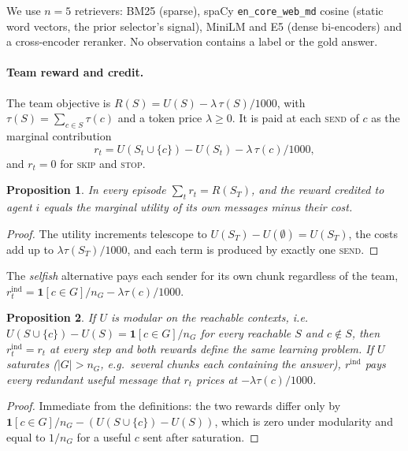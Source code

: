 \documentclass[sigconf,anonymous]{aamas}
\theoremstyle{plain}
\newtheorem{proposition}{Proposition}
\theoremstyle{definition}
\begin{document}
\noindent We use $n=5$ retrievers: BM25 (sparse), spaCy \texttt{en\_core\_web\_md} cosine (static word vectors, the prior selector's signal), MiniLM and E5 (dense bi-encoders) and a cross-encoder reranker. No observation contains a label or the gold answer.

\paragraph{Team reward and credit.}
The team objective is $R(S)=U(S)-\lambda\,\tau(S)/1000$, with $\tau(S)=\sum_{c\in S}\tau(c)$ and a token price $\lambda\ge0$. It is paid at each \textsc{send} of $c$ as the marginal contribution
\begin{equation}
r_t=U(S_t\cup\{c\})-U(S_t)-\lambda\,\tau(c)/1000,
\end{equation}
and $r_t=0$ for \textsc{skip} and \textsc{stop}.

\begin{proposition}\label{prop:telescope}
In every episode $\sum_t r_t=R(S_T)$, and the reward credited to agent $i$ equals the marginal utility of its own messages minus their cost.
\end{proposition}
\begin{proof}
The utility increments telescope to $U(S_T)-U(\emptyset)=U(S_T)$, the costs add up to $\lambda\tau(S_T)/1000$, and each term is produced by exactly one \textsc{send}.
\end{proof}

\noindent The \emph{selfish} alternative pays each sender for its own chunk regardless of the team, $r^{\mathrm{ind}}_t=\mathbf{1}[c\in G]/n_G-\lambda\tau(c)/1000$.

\begin{proposition}\label{prop:modular}
If $U$ is modular on the reachable contexts, i.e.\ $U(S\cup\{c\})-U(S)=\mathbf{1}[c\in G]/n_G$ for every reachable $S$ and $c\notin S$, then $r^{\mathrm{ind}}_t=r_t$ at every step and both rewards define the same learning problem. If $U$ saturates ($|G|>n_G$, e.g.\ several chunks each containing the answer), $r^{\mathrm{ind}}$ pays every redundant useful message that $r_t$ prices at $-\lambda\tau(c)/1000$.
\end{proposition}
\begin{proof}
Immediate from the definitions: the two rewards differ only by $\mathbf{1}[c\in G]/n_G-(U(S\cup\{c\})-U(S))$, which is zero under modularity and equal to $1/n_G$ for a useful $c$ sent after saturation.
\end{proof}
\end{document}
